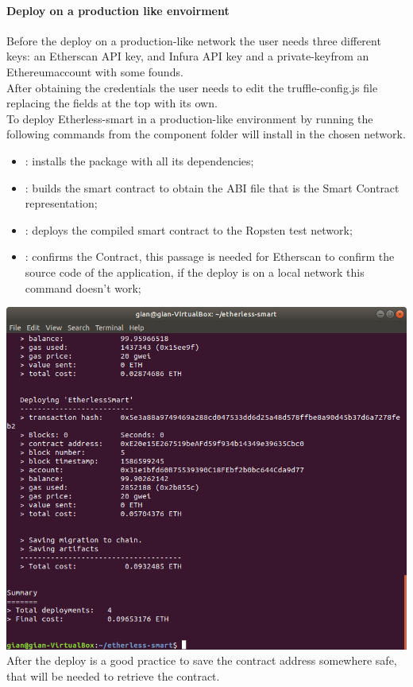 \paragraph{Deploy on a production like envoirment}
Before the deploy on a production-like network the user needs three different keys: an Etherscan API
key, and Infura API key and a private-key\glo from an Ethereum\glo account with some founds.\\
After obtaining the credentials the user needs to edit the truffle-config.js file replacing the fields at the top with its own. \\
To deploy Etherless-smart in a production-like environment
by running the following commands from the component folder will install in the chosen network.
\begin{itemize}
    \item {} : installs the package with all its dependencies;
    \item {}: builds the smart contract to obtain the ABI file that is the Smart Contract representation;
    \item {}: deploys the compiled smart contract to the Ropsten test network;
    \item {}: confirms the Contract, this passage is needed for Etherscan to confirm the source code of the application, if the deploy is on a local network this command doesn't work;
\end{itemize}
\includegraphics[width=\textwidth]{res/img/deployContract.png}
After the deploy is a good practice to save the contract address somewhere safe, that will be needed to retrieve the contract.
